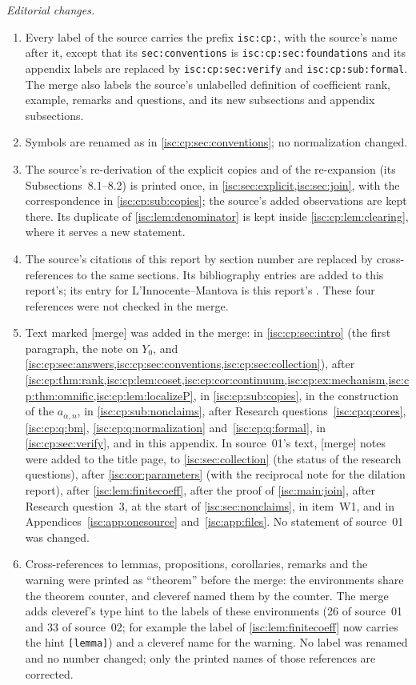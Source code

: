 \documentclass[11pt,letterpaper]{article}
\theoremstyle{definition}
\theoremstyle{remark}
\newcommand{\lbl}[1]{\nolinkurl{#1}}%
\newcommand{\mtag}{\textup{[merge]}}%
\numberwithin{equation}{section}
\begin{document}
\emph{Editorial changes.}
\begin{enumerate}[label=(\arabic*)]
\item Every label of the source carries the prefix \texttt{isc:cp:}, with
the source's name after it, except that its \texttt{sec:conventions} is
\lbl{isc:cp:sec:foundations} and its appendix labels are replaced by
\lbl{isc:cp:sec:verify} and \lbl{isc:cp:sub:formal}. The merge also labels
the source's unlabelled definition of coefficient rank, example, remarks
and questions, and its new subsections and appendix subsections.
\item Symbols are renamed as in \cref{isc:cp:sec:conventions}; no
normalization changed.
\item The source's re-derivation of the explicit copies and of the
re-expansion (its Subsections~8.1--8.2) is printed once, in
\cref{isc:sec:explicit,isc:sec:join}, with the correspondence in
\cref{isc:cp:sub:copies}; the source's added observations are kept there.
Its duplicate of \cref{isc:lem:denominator} is kept inside
\cref{isc:cp:lem:clearing}, where it serves a new statement.
\item The source's citations of this report by section number are replaced
by cross-references to the same sections. Its bibliography entries
\cite{KKS,KM,BM,StacksLD} are added to this report's; its entry for
L'Innocente--Mantova is this report's \cite{LM}. These four references
were not checked in the merge.
\item Text marked \mtag{} was added in the merge: in
\cref{isc:cp:sec:intro} (the first paragraph, the note on $Y_0$, and
\cref{isc:cp:sec:answers,isc:cp:sec:conventions,isc:cp:sec:collection}),
after \cref{isc:cp:thm:rank,isc:cp:lem:coset,isc:cp:cor:continuum,isc:cp:ex:mechanism,isc:cp:thm:omnific,isc:cp:lem:localizeP},
in \cref{isc:cp:sub:copies}, in the construction of the $a_{\alpha,n}$, in
\cref{isc:cp:sub:nonclaims}, after Research
questions~\ref{isc:cp:q:cores}, \ref{isc:cp:q:bm},
\ref{isc:cp:q:normalization} and~\ref{isc:cp:q:formal}, in
\cref{isc:cp:sec:verify}, and in this appendix. In source~01's text, \mtag{}
notes were added to the title page, to \cref{isc:sec:collection} (the status
of the research questions), after \cref{isc:cor:parameters} (with the
reciprocal note for the dilation report), after
\cref{isc:lem:finitecoeff}, after the proof of \cref{isc:main:join}, after
Research question~3, at the start of \cref{isc:sec:nonclaims}, in item~W1,
and in Appendices~\ref{isc:app:onesource} and~\ref{isc:app:files}. No
statement of source~01 was changed.
\item Cross-references to lemmas, propositions, corollaries, remarks and
the warning were printed as ``theorem'' before the merge: the environments
share the theorem counter, and cleveref named them by the counter. The
merge adds cleveref's type hint to the labels of these environments (26 of
source~01 and 33 of source~02; for example the label of
\cref{isc:lem:finitecoeff} now carries the hint \texttt{[lemma]}) and a
cleveref name for the warning. No label was renamed and no number changed; only the printed names
of those references are corrected.
\end{enumerate}
\end{document}
